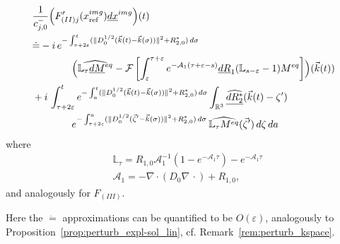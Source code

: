 \documentclass{ws-m3as}
\newcommand{\uld}[1]{\underline{d#1}}
\def\Mpp{M_{\perp\!\!\!\!\!\bigcirc}}
\def\Mphp{\widehat{\Mpp}}
\def\pp{p_{\perp\!\!\!\!\!\bigcirc}}
\newcommand\taup{\varepsilon}
\newcommand{\Dterm}[1]{\|D_0^{1/2}{#1}\|^2}
\begin{document}
\begin{equation}\label{FIIprimeD0}
\begin{aligned}
&\frac{1}{c_{j,0}^-}\Bigl(F_{(II)j}'(x^{img}_{\text{ref}})\uld{x}^{img}\Bigr)(t)
\\
&\dot{=}
-i\,e^{-\int_{\tau+2\taup}^t(\Dterm{({\vec k}(t)-\vec k(\sigma))}+R_{2,0}^*)\, d\sigma}\\
&\qquad\qquad\Bigl(\widehat{\mathbb{L}_\tau \uld{M}^{eq}}
-\mathcal{F}\left[\int_\taup^{\tau+\taup}e^{-\mathcal{A}_1(\tau+\taup-s)}\uld{R}_1(\mathbb{L}_{s-\taup}-1)M^{eq}\right]\Bigr)({\vec k}(t))
\\&+i\,\int_{\tau+2\taup}^t e^{-\int_a^t(\Dterm{({\vec k}(t)-\vec k(\sigma))}+R_{2,0}^*)\, d\sigma}
\int_{\mathbb{R}^3}\widehat{\uld{R_2^*}}({\vec k}(t)-\zeta')\\
&\qquad\qquad e^{-\int_{\tau+2\taup}^a(\Dterm{(\vec\zeta'-\vec k(\sigma))} +R_{2,0}^*)\, d\sigma}\,\widehat{\mathbb{L}_\tau M^{eq}}(\vec\zeta')
\,d\zeta\, da\\
\end{aligned}
\end{equation}
where 
\[
\begin{aligned}
&\mathbb{L}_\tau=R_{1,0}\mathcal{A}_1^{-1}(1-e^{-\mathcal{A}_1\tau})-e^{-\mathcal{A}_1\tau}\\
&\mathcal{A}_1=-\nabla\cdot(D_0\nabla\, \cdot)+R_{1,0},
\end{aligned}
\]
and analogously for $F_{(III)}$.

Here the $\dot{=}$ approximations can be quantified to be $O(\taup)$, analogously to Proposition~\ref{prop:perturb_expl-sol_lin}, cf. Remark~\ref{rem:perturb_kspace}.
\end{document}
